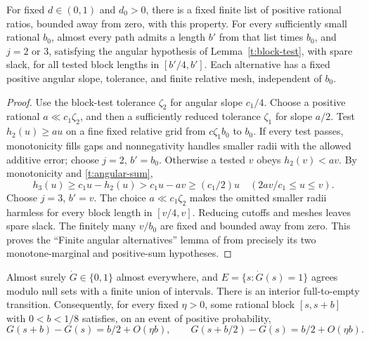 \begin{lemma}\label{t:angular-alternatives}
For fixed $d\in(0,1)$ and $d_0>0$, there is a fixed finite list of
positive rational ratios, bounded away from zero, with this property.
For every sufficiently small rational $b_0$, almost every path admits
a length $b'$ from that list times $b_0$, and $j=2$ or $3$, satisfying
the angular hypothesis of Lemma~\ref{t:block-test}, with spare slack,
for all tested block lengths in $[b'/4,b']$.  Each alternative has a
fixed positive angular slope, tolerance, and finite relative mesh,
independent of $b_0$.
\end{lemma}

\begin{proof}
Use the block-test tolerance $\zeta_2$ for angular slope $c_1/4$.
Choose a positive rational $a\ll c_1\zeta_2$, and then a sufficiently
reduced tolerance $\zeta_1$ for slope $a/2$.  Test
$h_2(u)\ge au$ on a fine fixed relative grid from $c\zeta_1b_0$ to
$b_0$.  If every test passes, monotonicity fills gaps and nonnegativity
handles smaller radii with the allowed additive error; choose $j=2$,
$b'=b_0$.  Otherwise a tested $v$ obeys $h_2(v)<av$.  By monotonicity
and \eqref{t:angular-sum},
\[
 h_3(u)\ge c_1u-h_2(u)>c_1u-av\ge(c_1/2)u
          \quad(2av/c_1\le u\le v).
\]
Choose $j=3$, $b'=v$.  The choice $a\ll c_1\zeta_2$ makes the omitted
smaller radii harmless for every block length in $[v/4,v]$.
Reducing cutoffs and meshes leaves spare slack.  The finitely many
$v/b_0$ are fixed and bounded away from zero.  This proves the
``Finite angular alternatives'' lemma of \citet[Section~3]{PSE2026}
from precisely its two monotone-marginal and positive-sum hypotheses.
\end{proof}

\begin{lemma}\label{t:alternation}
Almost surely $\dot G\in\{0,1\}$ almost everywhere, and
$E=\{s:\dot G(s)=1\}$ agrees modulo null sets with a finite union of
intervals.  There is an interior full-to-empty transition.  Consequently,
for every fixed $\eta>0$, some rational block $[s,s+b]$ with $0<b<1/8$
satisfies, on an event of positive probability,
\begin{equation}\label{t:jump}
 G(s+b)-G(s)=b/2+O(\eta b),\qquad
 G(s+b/2)-G(s)=b/2+O(\eta b).
\end{equation}
\end{lemma}


